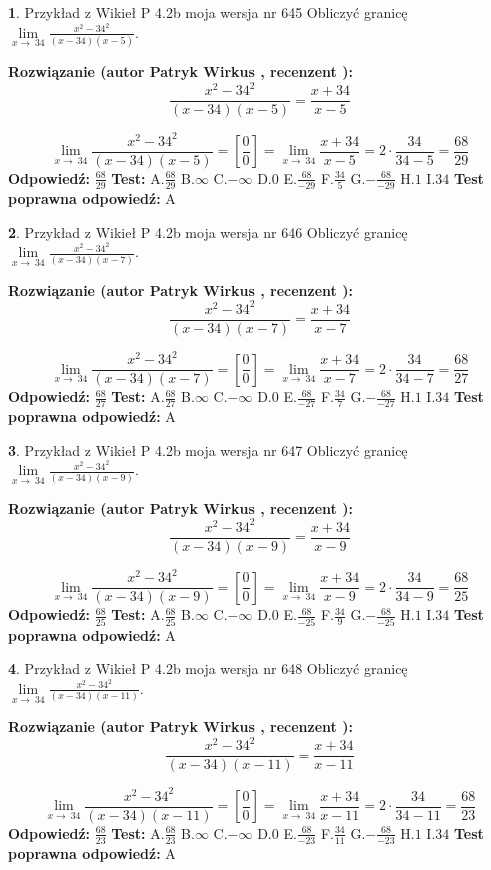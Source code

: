 \documentclass[12pt, a4paper]{article}
\theoremstyle{definition} %
\newtheorem{zad}{}
\newcommand{\zadStart}[1]{\begin{zad}#1\newline}
\newcommand{\zadStop}{\end{zad}}
\newcommand{\rozwStart}[2]{\noindent \textbf{Rozwiązanie (autor #1 , recenzent #2): }\newline}
\newcommand{\rozwStop}{\newline}
\newcommand{\odpStart}{\noindent \textbf{Odpowiedź:}\newline}
\newcommand{\odpStop}{\newline}
\newcommand{\testStart}{\noindent \textbf{Test:}\newline}
\newcommand{\testStop}{\newline}
\newcommand{\kluczStart}{\noindent \textbf{Test poprawna odpowiedź:}\newline}
\newcommand{\kluczStop}{\newline}
\begin{document}
\zadStart{Przykład z Wikieł P 4.2b moja wersja nr 645}
Obliczyć granicę $\lim\limits_{x\to\ 34}\frac{x^{2}-34^{2}}{(x-34)(x-5)}$.
\zadStop
\rozwStart{Patryk Wirkus}{}
$$\frac{x^{2}-34^{2}}{(x-34)(x-5)}=\frac{x+34}{x-5}$$

$$\lim\limits_{x\to\ 34}\frac{x^{2}-34^{2}}{(x-34)(x-5)}=[\frac{0}{0}]=\lim\limits_{x\to\ 34}\frac{x+34}{x-5}=2 \cdot \frac{34}{34-5} = \frac{68}{29}$$
\rozwStop
\odpStart
$\frac{68}{29}$
\odpStop
\testStart
A.$\frac{68}{29}$
B.$\infty$
C.$-\infty$
D.$0$
E.$\frac{68}{-29}$
F.$\frac{34}{5}$
G.$-\frac{68}{-29}$
H.$1$
I.$34$
\testStop
\kluczStart
A
\kluczStop



\zadStart{Przykład z Wikieł P 4.2b moja wersja nr 646}
Obliczyć granicę $\lim\limits_{x\to\ 34}\frac{x^{2}-34^{2}}{(x-34)(x-7)}$.
\zadStop
\rozwStart{Patryk Wirkus}{}
$$\frac{x^{2}-34^{2}}{(x-34)(x-7)}=\frac{x+34}{x-7}$$

$$\lim\limits_{x\to\ 34}\frac{x^{2}-34^{2}}{(x-34)(x-7)}=[\frac{0}{0}]=\lim\limits_{x\to\ 34}\frac{x+34}{x-7}=2 \cdot \frac{34}{34-7} = \frac{68}{27}$$
\rozwStop
\odpStart
$\frac{68}{27}$
\odpStop
\testStart
A.$\frac{68}{27}$
B.$\infty$
C.$-\infty$
D.$0$
E.$\frac{68}{-27}$
F.$\frac{34}{7}$
G.$-\frac{68}{-27}$
H.$1$
I.$34$
\testStop
\kluczStart
A
\kluczStop



\zadStart{Przykład z Wikieł P 4.2b moja wersja nr 647}
Obliczyć granicę $\lim\limits_{x\to\ 34}\frac{x^{2}-34^{2}}{(x-34)(x-9)}$.
\zadStop
\rozwStart{Patryk Wirkus}{}
$$\frac{x^{2}-34^{2}}{(x-34)(x-9)}=\frac{x+34}{x-9}$$

$$\lim\limits_{x\to\ 34}\frac{x^{2}-34^{2}}{(x-34)(x-9)}=[\frac{0}{0}]=\lim\limits_{x\to\ 34}\frac{x+34}{x-9}=2 \cdot \frac{34}{34-9} = \frac{68}{25}$$
\rozwStop
\odpStart
$\frac{68}{25}$
\odpStop
\testStart
A.$\frac{68}{25}$
B.$\infty$
C.$-\infty$
D.$0$
E.$\frac{68}{-25}$
F.$\frac{34}{9}$
G.$-\frac{68}{-25}$
H.$1$
I.$34$
\testStop
\kluczStart
A
\kluczStop



\zadStart{Przykład z Wikieł P 4.2b moja wersja nr 648}
Obliczyć granicę $\lim\limits_{x\to\ 34}\frac{x^{2}-34^{2}}{(x-34)(x-11)}$.
\zadStop
\rozwStart{Patryk Wirkus}{}
$$\frac{x^{2}-34^{2}}{(x-34)(x-11)}=\frac{x+34}{x-11}$$

$$\lim\limits_{x\to\ 34}\frac{x^{2}-34^{2}}{(x-34)(x-11)}=[\frac{0}{0}]=\lim\limits_{x\to\ 34}\frac{x+34}{x-11}=2 \cdot \frac{34}{34-11} = \frac{68}{23}$$
\rozwStop
\odpStart
$\frac{68}{23}$
\odpStop
\testStart
A.$\frac{68}{23}$
B.$\infty$
C.$-\infty$
D.$0$
E.$\frac{68}{-23}$
F.$\frac{34}{11}$
G.$-\frac{68}{-23}$
H.$1$
I.$34$
\testStop
\kluczStart
A
\kluczStop
\end{document}
